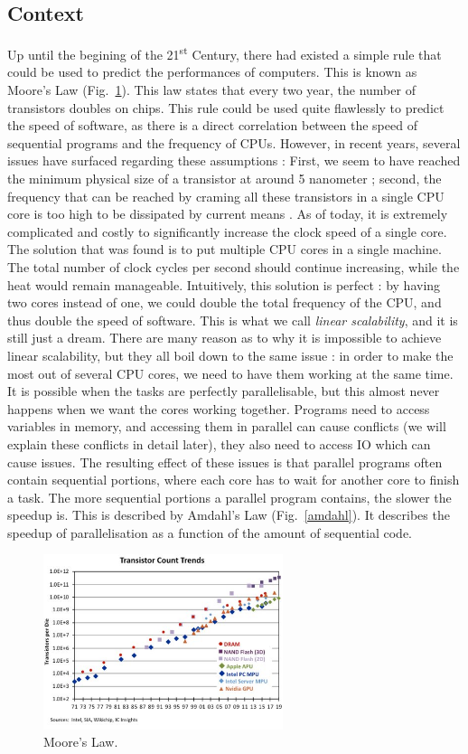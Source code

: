 \documentclass[conference]{IEEEtran}
\begin{document}
\subsection{Context}
Up until the begining of the 21\textsuperscript{st} Century, there had existed a simple rule that could be used to predict the performances of computers. This is known as Moore's Law (Fig.~\ref{moore}). This law states that every two year, the number of transistors doubles on chips. This rule could be used quite flawlessly to predict the speed of software, as there is a direct correlation between the speed of sequential programs and the frequency of CPUs. However, in recent years, several issues have surfaced regarding these assumptions : First, we seem to have reached the minimum physical size of a transistor at around 5 nanometer ; second, the frequency that can be reached by craming all these transistors in a single CPU core is too high to be dissipated by current means \cite{moore}. As of today, it is extremely complicated and costly to significantly increase the clock speed of a single core. The solution that was found is to put multiple CPU cores in a single machine. The total number of clock cycles per second should continue increasing, while the heat would remain manageable. Intuitively, this solution is perfect : by having two cores instead of one, we could double the total frequency of the CPU, and thus double the speed of software. This is what we call \textit{linear scalability}, and it is still just a dream. There are many reason as to why it is impossible to achieve linear scalability, but they all boil down to the same issue : in order to make the most out of several CPU cores, we need to have them working at the same time. It is possible when the tasks are perfectly parallelisable, but this almost never happens when we want the cores working together. Programs need to access variables in memory, and accessing them in parallel can cause conflicts (we will explain these conflicts in detail later), they also need to access IO which can cause issues. The resulting effect of these issues is that parallel programs often contain sequential portions, where each core has to wait for another core to finish a task. The more sequential portions a parallel program contains, the slower the speedup is. This is described by Amdahl's Law \cite{amdahl} (Fig.~\ref{amdahl}). It describes the speedup of parallelisation as a function of the amount of sequential code.

\begin{figure}[!ht]
\centerline{\includegraphics[width=70mm]{moore.jpg}}
\caption{Moore's Law.}\label{moore}
\end{figure}
\end{document}

